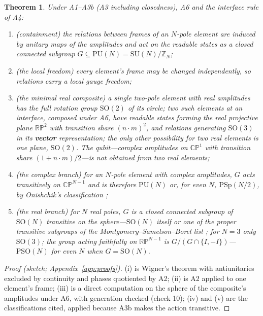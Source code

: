 \documentclass[11pt,a4paper]{article}
\theoremstyle{plain}
\newtheorem{theorem}{Theorem}
\theoremstyle{definition}
\theoremstyle{remark}
\newcommand{\RP}{\mathbb{RP}}
\newcommand{\CP}{\mathbb{CP}}
\newcommand{\SO}{\mathrm{SO}}
\newcommand{\SU}{\mathrm{SU}}
\newcommand{\PU}{\mathrm{PU}}
\newcommand{\PSp}{\mathrm{PSp}}
\newcommand{\PSO}{\mathrm{PSO}}
\begin{document}
\begin{theorem}\label{thm:group}
Under A1--A3b (A3 including closedness), A6 and the interface rule of A4:
\begin{enumerate}[label=(\roman*),leftmargin=2em]
\item (containment) the relations between frames of an $N$-pole element are induced by unitary maps of the amplitudes and act on the readable states as a closed connected subgroup $G\subseteq\PU(N)=\SU(N)/\mathbb{Z}_N$;
\item (the local freedom) every element's frame may be changed independently, so relations carry a local gauge freedom;
\item (the minimal real composite) a single two-pole element with real amplitudes has the full rotation group $\SO(2)$ of its circle; two such elements at an interface, composed under A6, have readable states forming the real projective plane $\RP^2$ with transition share $(n\cdot m)^2$, and relations generating $\SO(3)$ in its \textbf{vector} representation; the only other possibility for two real elements is one plane, $\SO(2)$. The qubit---complex amplitudes on $\CP^1$ with transition share $(1+n\cdot m)/2$---is \emph{not} obtained from two real elements;
\item (the complex branch) for an $N$-pole element with complex amplitudes, $G$ acts transitively on $\CP^{N-1}$ and is therefore $\PU(N)$ or, for even $N$, $\PSp(N/2)$, by Onishchik's classification \cite{onishchik};
\item (the real branch) for $N$ real poles, $G$ is a closed connected subgroup of $\SO(N)$ transitive on the sphere---$\SO(N)$ itself or one of the proper transitive subgroups of the Montgomery--Samelson--Borel list \cite{ms,borel}; for $N=3$ only $\SO(3)$; the group acting faithfully on $\RP^{N-1}$ is $G/(G\cap\{I,-I\})$---$\PSO(N)$ for even $N$ when $G=\SO(N)$.
\end{enumerate}
\end{theorem}

\begin{proof}[Proof (sketch; Appendix~\ref{app:proofs})]
(i) is Wigner's theorem \cite{wigner,bargmann} with antiunitaries excluded by continuity and phases quotiented by A2; (ii) is A2 applied to one element's frame; (iii) is a direct computation on the sphere of the composite's amplitudes under A6, with generation checked (check 10); (iv) and (v) are the classifications cited, applied because A3b makes the action transitive.
\end{proof}
\end{document}
